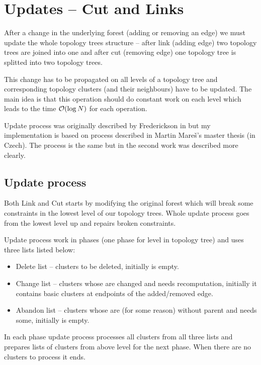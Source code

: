 \section{Updates -- Cut and Links}

After a change in the underlying forest (adding or removing an edge) we must
update the whole topology trees structure -- after link (adding edge) two
topology trees are joined into one and after cut (removing edge) one topology
tree is splitted into two topology trees.

This change has to be propagated on all levels of a topology tree and
corresponding topology clusters (and their neighbours) have to be updated. The
main idea is that this operation should do constant work on each level which
leads to the time ${\cal O}(\log N)$ for each operation.

Update process was originally described by Frederickson in
\cite{DSforDynamicallyMaintainingRootedTrees} but my implementation is based on
process described in Martin Mareš's master thesis \cite{DGA} (in Czech). The
process is the same but in the second work was described more clearly.

\subsection{Update process}

Both Link and Cut starts by modifying the original forest which will break some
constraints in the lowest level of our topology trees. Whole update process
goes from the lowest level up and repairs broken constraints.

Update process work in phases (one phase for level in topology tree) and uses
three lists listed below:
\begin{itemize}
\item Delete list -- clusters to be deleted, initially is empty.
\item Change list -- clusters whose are changed and needs recomputation, initially
it contains basic clusters at endpoints of the added/removed edge.
\item Abandon list -- clusters whose are (for some reason) without parent and
needs some, initially is empty.
\end{itemize}

In each phase update process processes all clusters from all three lists and
prepares lists of clusters from above level for the next phase. When there are
no clusters to process it ends.

